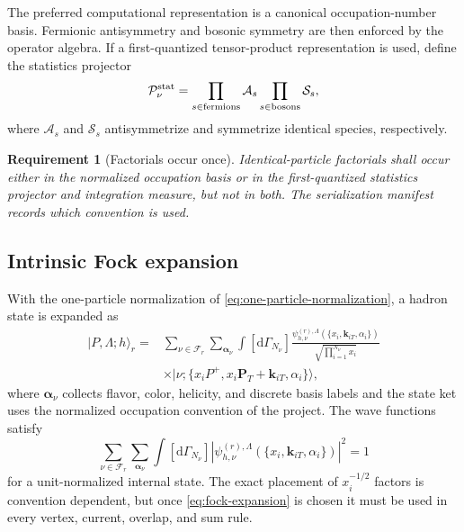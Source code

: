 \documentclass[11pt]{article}
\newtheorem{requirement}[definition]{Requirement}
\newcommand{\PT}{\bm{P}_{T}}
\newcommand{\dd}{\mathrm{d}}
\newcommand{\cS}{\mathcal S}
\newcommand{\cP}{\mathcal P}
\newcommand{\cF}{\mathcal F}
\newcommand{\cA}{\mathcal A}
\begin{document}
The preferred computational representation is a canonical occupation-number
basis.  Fermionic antisymmetry and bosonic symmetry are then enforced by the
operator algebra.  If a first-quantized tensor-product representation is
used, define the statistics projector
\begin{equation}
 \cP_{\nu}^{\rm stat}
 =\prod_{s\in\mathrm{fermions}}\cA_s
  \prod_{s\in\mathrm{bosons}}\cS_s,
\label{eq:statistics-projector}
\end{equation}
where \(\cA_s\) and \(\cS_s\) antisymmetrize and symmetrize identical species,
respectively.

\begin{requirement}[Factorials occur once]
\label{req:factorials-once}
Identical-particle factorials shall occur either in the normalized occupation
basis or in the first-quantized statistics projector and integration measure,
but not in both.  The serialization manifest records which convention is
used.
\end{requirement}

\subsection{Intrinsic Fock expansion}

With the one-particle normalization of
\cref{eq:one-particle-normalization}, a hadron state is expanded as
\begin{equation}
\begin{split}
 |P,\Lambda;h\rangle_r
 ={}&\sum_{\nu\in\cF_r}
 \sum_{\bm\alpha_\nu}
 \int[\dd\Gamma_{N_\nu}]
 \frac{\psi^{(r),\Lambda}_{h,\nu}
 (\{x_i,\bm k_{iT},\alpha_i\})}
 {\sqrt{\prod_{i=1}^{N_\nu}x_i}}
 \\
 &\times
 |\nu;\{x_iP^+,x_i\PT+\bm k_{iT},\alpha_i\}\rangle,
\end{split}
\label{eq:fock-expansion}
\end{equation}
where \(\bm\alpha_\nu\) collects flavor, color, helicity, and discrete basis
labels and the state ket uses the normalized occupation convention of the
project.  The wave functions satisfy
\begin{equation}
 \sum_{\nu\in\cF_r}
 \sum_{\bm\alpha_\nu}
 \int[\dd\Gamma_{N_\nu}]
 \left|\psi^{(r),\Lambda}_{h,\nu}
 (\{x_i,\bm k_{iT},\alpha_i\})\right|^2=1
\label{eq:fock-normalization}
\end{equation}
for a unit-normalized internal state.  The exact placement of
\(x_i^{-1/2}\) factors is convention dependent, but once
\cref{eq:fock-expansion} is chosen it must be used in every vertex, current,
overlap, and sum rule.
\end{document}
